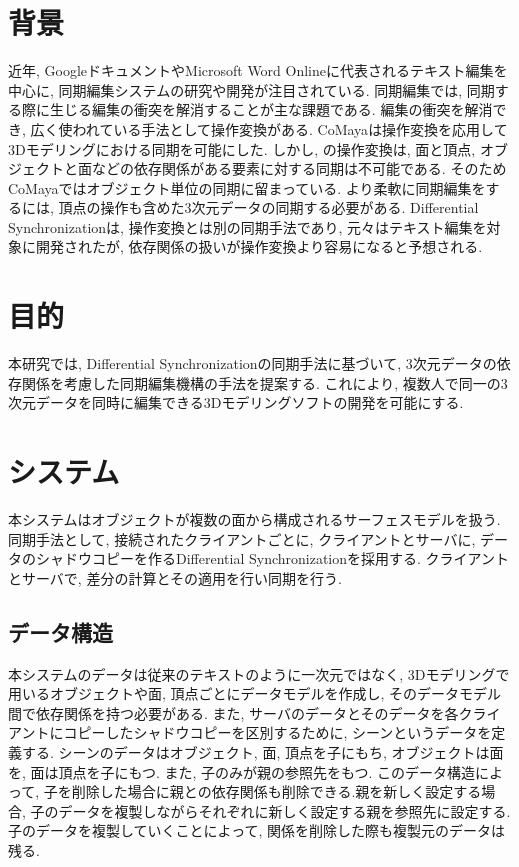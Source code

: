 \documentclass{AIabst}
\begin{document}
\makeAbstHeader
%
%
%
\section{背景}
	近年, GoogleドキュメントやMicrosoft Word Onlineに代表されるテキスト編集を中心に, 同期編集システムの研究や開発が注目されている.
	同期編集では, 同期する際に生じる編集の衝突を解消することが主な課題である.
	編集の衝突を解消でき, 広く使われている手法として操作変換がある.
	CoMaya\cite{COMAYA}は操作変換を応用して3Dモデリングにおける同期を可能にした.
	しかし, \cite{COMAYA}の操作変換は, 面と頂点, オブジェクトと面などの依存関係がある要素に対する同期は不可能である.
	そのためCoMayaではオブジェクト単位の同期に留まっている.
	より柔軟に同期編集をするには, 頂点の操作も含めた3次元データの同期する必要がある.
	Differential Synchronization\cite{DS}は, 操作変換とは別の同期手法であり, 元々はテキスト編集を対象に開発されたが, 依存関係の扱いが操作変換より容易になると予想される.
\section{目的}
 本研究では, Differential Synchronizationの同期手法に基づいて, 3次元データの依存関係を考慮した同期編集機構の手法を提案する.
  これにより, 複数人で同一の3次元データを同時に編集できる3Dモデリングソフトの開発を可能にする.
\section{システム}
 本システムはオブジェクトが複数の面から構成されるサーフェスモデルを扱う. 同期手法として, 接続されたクライアントごとに, クライアントとサーバに, データのシャドウコピーを作るDifferential Synchronizationを採用する. クライアントとサーバで, 差分の計算とその適用を行い同期を行う.
  \subsection{データ構造}
	本システムのデータは従来のテキストのように一次元ではなく, 3Dモデリングで用いるオブジェクトや面, 頂点ごとにデータモデルを作成し, そのデータモデル間で依存関係を持つ必要がある.
  また, サーバのデータとそのデータを各クライアントにコピーしたシャドウコピーを区別するために, シーンというデータを定義する.
  シーンのデータはオブジェクト, 面, 頂点を子にもち, オブジェクトは面を, 面は頂点を子にもつ. また, 子のみが親の参照先をもつ.
   このデータ構造によって, 子を削除した場合に親との依存関係も削除できる.親を新しく設定する場合, 子のデータを複製しながらそれぞれに新しく設定する親を参照先に設定する.
   子のデータを複製していくことによって, 関係を削除した際も複製元のデータは残る.
\end{document}
